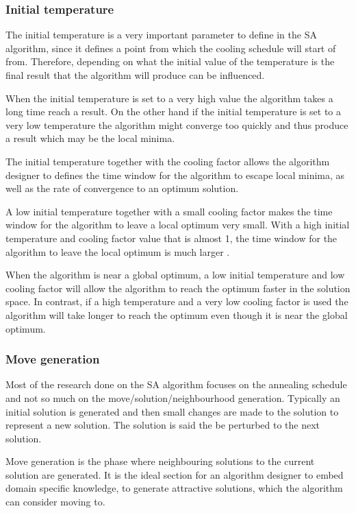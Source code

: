 \subsubsection{Initial temperature}
The initial temperature is a very important parameter to define in the SA algorithm, since it defines a point from which the cooling schedule will start of from. Therefore, depending on what the initial value of the temperature is the final result that the algorithm will produce can be influenced\cite{SALongestCommon,VariousCoolingSA,AutoConfigSA}.

When the initial temperature is set to a very high value the algorithm takes a long time reach a result. On the other hand if the initial temperature is set to a very low temperature the algorithm might converge too quickly and thus produce a result which may be the local minima\cite{SALongestCommon,VariousCoolingSA,AutoConfigSA}.

The initial temperature together with the cooling factor allows the algorithm designer to defines the time window for the algorithm to escape local minima, as well as the rate of convergence to an optimum solution\cite{SALongestCommon,VariousCoolingSA}.

A low initial temperature together with a small cooling factor makes the time window for the algorithm to leave a local optimum very small\cite{SALongestCommon}. With a high initial temperature and cooling factor value that is almost 1, the time window for the algorithm to leave the local optimum is much larger \cite{SALongestCommon}. 

When the algorithm is near a global optimum, a low initial temperature and low cooling factor will allow the algorithm to reach the optimum faster in the solution space. In contrast, if a high temperature and a very low cooling factor is used the algorithm will take longer to reach the optimum even though it is near the global optimum\cite{SALongestCommon}.

\subsubsection{Move generation}
Most of the research done on the SA algorithm focuses on the annealing schedule and not so much on the move/solution/neighbourhood generation. Typically an initial solution is generated and then small changes are made to the solution to represent a new solution. The solution is said the be perturbed to the next solution.

Move generation is the phase where neighbouring solutions to the current solution are generated. It is the ideal section for an algorithm designer to embed domain specific knowledge, to generate attractive solutions, which the algorithm can consider moving to.

